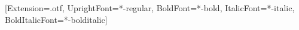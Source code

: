  {}
  {[Extension=.otf, UprightFont=*-regular, BoldFont=*-bold,
     ItalicFont=*-italic, BoldItalicFont=*-bolditalic]}
\def\EMlead{1.45}
